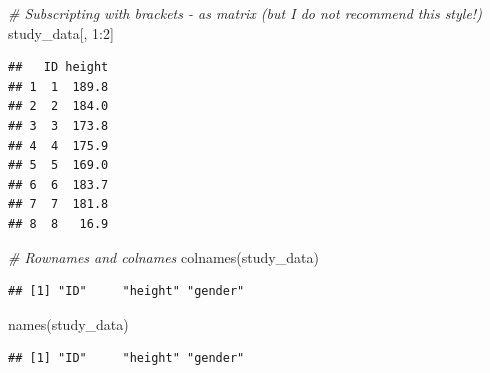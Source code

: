 \documentclass[
]{book}
\newenvironment{Shaded}{\begin{snugshade}}{\end{snugshade}}
\newcommand{\CommentTok}[1]{\textcolor[rgb]{0.56,0.35,0.01}{\textit{#1}}}
\newcommand{\ConstantTok}[1]{\textcolor[rgb]{0.00,0.00,0.00}{#1}}
\newcommand{\DecValTok}[1]{\textcolor[rgb]{0.00,0.00,0.81}{#1}}
\newcommand{\FloatTok}[1]{\textcolor[rgb]{0.00,0.00,0.81}{#1}}
\newcommand{\FunctionTok}[1]{\textcolor[rgb]{0.00,0.00,0.00}{#1}}
\newcommand{\NormalTok}[1]{#1}
\newcommand{\OtherTok}[1]{\textcolor[rgb]{0.56,0.35,0.01}{#1}}
\newcommand{\SpecialCharTok}[1]{\textcolor[rgb]{0.00,0.00,0.00}{#1}}
\begin{document}
\begin{Shaded}
\begin{Highlighting}[]
\CommentTok{\# Subscripting with brackets {-} as matrix (but I do not recommend this style!)}
\NormalTok{study\_data[, }\DecValTok{1}\SpecialCharTok{:}\DecValTok{2}\NormalTok{]}
\end{Highlighting}
\end{Shaded}

\begin{verbatim}
##   ID height
## 1  1  189.8
## 2  2  184.0
## 3  3  173.8
## 4  4  175.9
## 5  5  169.0
## 6  6  183.7
## 7  7  181.8
## 8  8   16.9
\end{verbatim}

\begin{Shaded}
\begin{Highlighting}[]
\CommentTok{\# Rownames and colnames}
\FunctionTok{colnames}\NormalTok{(study\_data)}
\end{Highlighting}
\end{Shaded}

\begin{verbatim}
## [1] "ID"     "height" "gender"
\end{verbatim}

\begin{Shaded}
\begin{Highlighting}[]
\FunctionTok{names}\NormalTok{(study\_data)}
\end{Highlighting}
\end{Shaded}

\begin{verbatim}
## [1] "ID"     "height" "gender"
\end{verbatim}

\begin{Shaded}
\end{Shaded}
\end{document}
